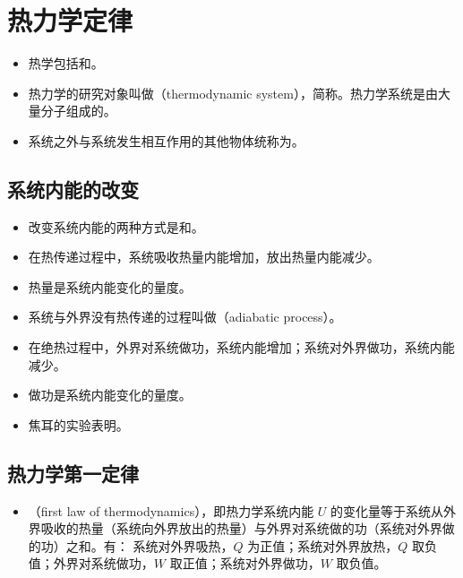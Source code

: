 \section{热力学定律}

\vspace{10pt}
\begin{itemize}
\item 热学包括和。
\item 热力学的研究对象叫做（thermodynamic system），简称。热力学系统是由大量分子组成的。
\item 系统之外与系统发生相互作用的其他物体统称为。
\end{itemize}

\subsection{系统内能的改变}
\begin{itemize}
\item 改变系统内能的两种方式是和。
\item 在热传递过程中，系统吸收热量内能增加，放出热量内能减少。
\item 热量是系统内能变化的量度。
\item 系统与外界没有热传递的过程叫做（adiabatic process）。
\item 在绝热过程中，外界对系统做功，系统内能增加；系统对外界做功，系统内能减少。
\item 做功是系统内能变化的量度。
\item 焦耳的实验表明。
\end{itemize}

\subsection{热力学第一定律}
\begin{itemize}
\item {}（first law of thermodynamics），即热力学系统内能 $U$ 的变化量等于系统从外界吸收的热量（系统向外界放出的热量）与外界对系统做的功（系统对外界做的功）之和。有：
系统对外界吸热，$Q$ 为正值；系统对外界放热，$Q$ 取负值；外界对系统做功，$W$ 取正值；系统对外界做功，$W$ 取负值。
\end{itemize}

